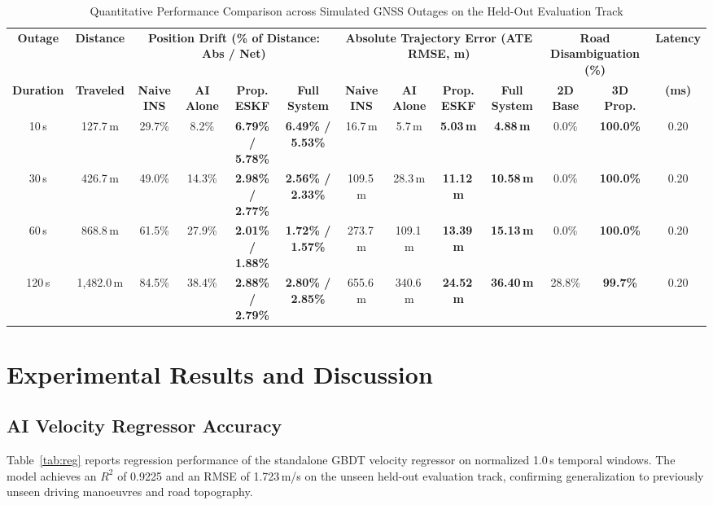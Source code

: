 \documentclass[conference]{IEEEtran}
\begin{document}
\begin{table}[t]
\centering
\caption{Quantitative Performance Comparison across Simulated GNSS Outages on the Held-Out Evaluation Track}
\label{tab:benchmark}
\small
\setlength{\tabcolsep}{3.8pt}
\begin{tabular}{cc|cccc|cccc|cc|c}
\toprule
\textbf{Outage} & \textbf{Distance} & \multicolumn{4}{c|}{\textbf{Position Drift (\% of Distance: Abs / Net)}} & \multicolumn{4}{c|}{\textbf{Absolute Trajectory Error (ATE RMSE, m)}} & \multicolumn{2}{c|}{\textbf{Road Disambiguation (\%)}} & \textbf{Latency} \\
\textbf{Duration} & \textbf{Traveled} & \textbf{Naive INS} & \textbf{AI Alone} & \textbf{Prop. ESKF} & \textbf{Full System} & \textbf{Naive INS} & \textbf{AI Alone} & \textbf{Prop. ESKF} & \textbf{Full System} & \textbf{2D Base} & \textbf{3D Prop.} & \textbf{(ms)} \\
\midrule
10\,s  & 127.7\,m  & 29.7\% & 8.2\%  & \textbf{6.79\% / 5.78\%} & \textbf{6.49\% / 5.53\%} & 16.7\,m  & 5.7\,m   & \textbf{5.03\,m}  & \textbf{4.88\,m}  & 0.0\%  & \textbf{100.0\%} & 0.20 \\
30\,s  & 426.7\,m  & 49.0\% & 14.3\% & \textbf{2.98\% / 2.77\%} & \textbf{2.56\% / 2.33\%} & 109.5\,m & 28.3\,m  & \textbf{11.12\,m} & \textbf{10.58\,m} & 0.0\%  & \textbf{100.0\%} & 0.20 \\
60\,s  & 868.8\,m  & 61.5\% & 27.9\% & \textbf{2.01\% / 1.88\%} & \textbf{1.72\% / 1.57\%} & 273.7\,m & 109.1\,m & \textbf{13.39\,m} & \textbf{15.13\,m} & 0.0\%  & \textbf{100.0\%} & 0.20 \\
120\,s & 1{,}482.0\,m & 84.5\% & 38.4\% & \textbf{2.88\% / 2.79\%} & \textbf{2.80\% / 2.85\%} & 655.6\,m & 340.6\,m & \textbf{24.52\,m} & \textbf{36.40\,m} & 28.8\% & \textbf{99.7\%}  & 0.20 \\
\bottomrule
\end{tabular}
\end{table}

\section{Experimental Results and Discussion}

\subsection{AI Velocity Regressor Accuracy}

Table~\ref{tab:reg} reports regression performance of the standalone GBDT velocity regressor on normalized 1.0\,s temporal windows. The model achieves an $R^2$ of 0.9225 and an RMSE of 1.723\,m/s on the unseen held-out evaluation track, confirming generalization to previously unseen driving manoeuvres and road topography.
\end{document}
